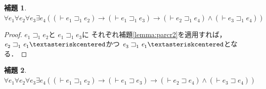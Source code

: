 \documentclass{ltjsbook}%
\newtheorem{lemma}{補題}[section]%
\newcommand\lemmaname{補題}%
\begin{document}
\begin{lemma}%
  \label{lemma:parcr1}%
  $\forall\mathit{e}_1^{}\forall\mathit{e}_2^{}\forall\mathit{e}_3^{}\exists\mathit{e}_4^{}%
  ((\vdash\mathit{e}_1^{}\sqsupset_1^{}\mathit{e}_2^{})\rightarrow%
  (\vdash\mathit{e}_1^{}\sqsupset_1^{}\mathit{e}_3^{})\rightarrow%
  (\vdash\mathit{e}_2^{}\sqsupset_1^{}\mathit{e}_4^{})\land%
  (\vdash\mathit{e}_3^{}\sqsupset_1^{}\mathit{e}_4^{}))$%
\end{lemma}%
\begin{proof}%
  $\mathit{e}_1^{}\sqsupset_1^{}\mathit{e}_2^{}$と%
  $\mathit{e}_1^{}\sqsupset_1^{}\mathit{e}_3^{}$に%
  それぞれ\lemmaname\ref{lemma:parcr2}を適用すれば，%
  $\mathit{e}_2^{}\sqsupset_1^{}\mathit{e}_1^{}\textasteriskcentered$かつ%
  $\mathit{e}_3^{}\sqsupset_1^{}\mathit{e}_1^{}\textasteriskcentered$となる．%
\end{proof}%
\begin{lemma}%
  \label{lemma:parcr3}%
  $\forall\mathit{e}_1^{}\forall\mathit{e}_2^{}\forall\mathit{e}_3^{}\exists\mathit{e}_4^{}%
  ((\vdash\mathit{e}_1^{}\sqsupset_1^{}\mathit{e}_2^{})\rightarrow%
  (\vdash\mathit{e}_1^{}\sqsupset\mathit{e}_3^{})\rightarrow%
  (\vdash\mathit{e}_2^{}\sqsupset\mathit{e}_4^{})\land%
  (\vdash\mathit{e}_3^{}\sqsupset\mathit{e}_4^{}))$%
\end{lemma}%
\end{document}
